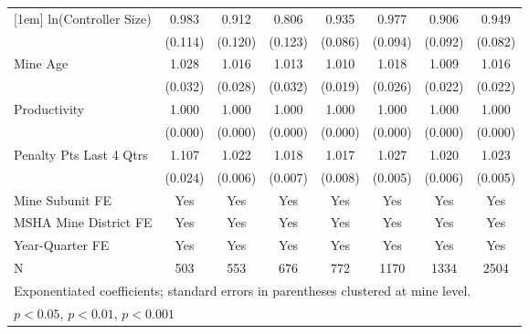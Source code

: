 {\begin{tabular}{l*{7}{c}}
[1em]
ln(Controller Size)      &       0.983         &       0.912         &       0.806         &       0.935         &       0.977         &       0.906         &       0.949         \\
                         &     (0.114)         &     (0.120)         &     (0.123)         &     (0.086)         &     (0.094)         &     (0.092)         &     (0.082)         \\
[1em]
Mine Age                 &       1.028         &       1.016         &       1.013         &       1.010         &       1.018         &       1.009         &       1.016         \\
                         &     (0.032)         &     (0.028)         &     (0.032)         &     (0.019)         &     (0.026)         &     (0.022)         &     (0.022)         \\
[1em]
Productivity             &       1.000         &       1.000         &       1.000         &       1.000         &       1.000         &       1.000         &       1.000         \\
                         &     (0.000)         &     (0.000)         &     (0.000)         &     (0.000)         &     (0.000)         &     (0.000)         &     (0.000)         \\
[1em]
Penalty Pts Last 4 Qtrs  &       1.107\sym{***}&       1.022\sym{***}&       1.018\sym{**} &       1.017\sym{*}  &       1.027\sym{***}&       1.020\sym{***}&       1.023\sym{***}\\
                         &     (0.024)         &     (0.006)         &     (0.007)         &     (0.008)         &     (0.005)         &     (0.006)         &     (0.005)         \\
[1em]
Mine Subunit FE          &         Yes         &         Yes         &         Yes         &         Yes         &         Yes         &         Yes         &         Yes         \\
[1em]
MSHA Mine District FE    &         Yes         &         Yes         &         Yes         &         Yes         &         Yes         &         Yes         &         Yes         \\
[1em]
Year-Quarter FE          &         Yes         &         Yes         &         Yes         &         Yes         &         Yes         &         Yes         &         Yes         \\
\hline
N                        &         503         &         553         &         676         &         772         &        1170         &        1334         &        2504         \\
\hline\hline
\multicolumn{8}{l}{\footnotesize Exponentiated coefficients; standard errors in parentheses clustered at mine level.}\\
\multicolumn{8}{l}{\footnotesize \sym{*} \(p<0.05\), \sym{**} \(p<0.01\), \sym{***} \(p<0.001\)}\\
\end{tabular}
}

